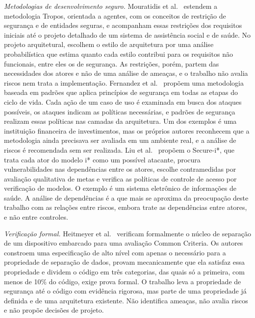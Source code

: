 \documentclass[conference]{IEEEtran}
\begin{document}
\emph{Metodologias de desenvolvimento seguro.} Mouratidis et al.~\cite{mouratidis2005} estendem a metodologia Tropos, orientada a agentes, com os conceitos de restrição de segurança e de entidades seguras, e acompanham essas restrições dos requisitos iniciais até o projeto detalhado de um sistema de assistência social e de saúde. No projeto arquitetural, escolhem o estilo de arquitetura por uma análise probabilística que estima quanto cada estilo contribui para os requisitos não funcionais, entre eles os de segurança. As restrições, porém, partem das necessidades dos atores e não de uma análise de ameaças, e o trabalho não avalia riscos nem trata a implementação. Fernandez et al.~\cite{fernandez2007} propõem uma metodologia baseada em padrões que aplica princípios de segurança em todas as etapas do ciclo de vida. Cada ação de um caso de uso é examinada em busca dos ataques possíveis, os ataques indicam as políticas necessárias, e padrões de segurança realizam essas políticas nas camadas da arquitetura. Um dos exemplos é uma instituição financeira de investimentos, mas os próprios autores reconhecem que a metodologia ainda precisava ser avaliada em um ambiente real, e a análise de riscos é recomendada sem ser realizada. Liu et al.~\cite{liu2009} propõem o Secure-i*, que trata cada ator do modelo i* como um possível atacante, procura vulnerabilidades nas dependências entre os atores, escolhe contramedidas por avaliação qualitativa de metas e verifica as políticas de controle de acesso por verificação de modelos. O exemplo é um sistema eletrônico de informações de saúde. A análise de dependências é a que mais se aproxima da preocupação deste trabalho com as relações entre riscos, embora trate as dependências entre atores, e não entre controles.

\emph{Verificação formal.} Heitmeyer et al.~\cite{heitmeyer2008} verificam formalmente o núcleo de separação de um dispositivo embarcado para uma avaliação Common Criteria. Os autores constroem uma especificação de alto nível com apenas o necessário para a propriedade de separação de dados, provam mecanicamente que ela satisfaz essa propriedade e dividem o código em três categorias, das quais só a primeira, com menos de 10\% do código, exige prova formal. O trabalho leva a propriedade de segurança até o código com evidência rigorosa, mas parte de uma propriedade já definida e de uma arquitetura existente. Não identifica ameaças, não avalia riscos e não propõe decisões de projeto.
\end{document}
